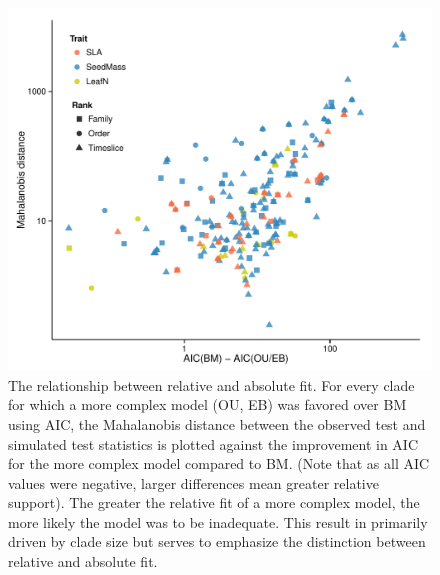 \begin{figure}[p]
  \centering
  \includegraphics[width=\textwidth]{figs/ad-aic}
  \caption[Model adequacy versus model support (ML)]{The relationship between relative and absolute fit. For every clade for which a more complex model (OU, EB) was favored over BM using AIC, the Mahalanobis distance between the observed test and simulated test statistics is plotted against the improvement in AIC for the more complex model compared to BM. (Note that as all AIC values were negative, larger differences mean greater relative support). The greater the relative fit of a more complex model, the more likely the model was to be inadequate. This result in primarily driven by clade size but serves to emphasize the distinction between relative and absolute fit.}
  \label{fig:supp-ad-aic}
\end{figure} 

